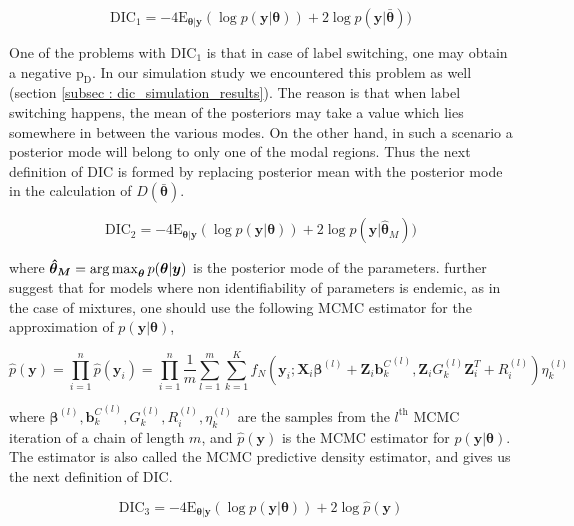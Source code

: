 \begin{equation}
\label{eq : DIC1}
\text{DIC}_1 = -4\text{E}_{\boldsymbol{\theta}|\boldsymbol{y}} (\log{p(\boldsymbol{y}|\boldsymbol{\theta})}) + 2\log{p(\boldsymbol{y}|\boldsymbol{\bar{\theta}})})
\end{equation}

One of the problems with $\text{DIC}_1$ is that in case of label switching, one may obtain a negative $\text{p}_\text{D}$. In our simulation study we encountered this problem as well (section \ref{subsec : dic_simulation_results}). The reason is that when label switching happens, the mean of the posteriors may take a value which lies somewhere in between the various modes. On the other hand, in such a scenario a posterior mode will belong to only one of the modal regions. Thus the next definition of DIC is formed by replacing posterior mean with the posterior mode in the calculation of $D(\boldsymbol{\bar{\theta}})$.

\begin{equation}
\label{eq : DIC2}
\text{DIC}_2 = -4\text{E}_{\boldsymbol{\theta}|\boldsymbol{y}} (\log{p(\boldsymbol{y}|\boldsymbol{\theta})}) + 2\log{p(\boldsymbol{y}|\boldsymbol{\hat{\theta}}_M)})
\end{equation}

where
$\boldsymbol{\hat{\theta}_M} = \operatorname*{arg\,max}_{\boldsymbol{\theta}}p(\boldsymbol{\theta}|\boldsymbol{y})$ is the posterior mode of the parameters. \citet{celeux_deviance_2006} further suggest that for models where non identifiability of parameters is endemic, as in the case of mixtures, one should use the following MCMC estimator for the approximation of $p(\boldsymbol{y}|\boldsymbol{\theta})$,

$$\hat{p}(\boldsymbol{y}) = \prod_{i=1}^n \hat{p}(\boldsymbol{y}_i) = \prod_{i=1}^n \frac 1 m \sum_{l=1}^m \sum_{k=1}^K f_N(\boldsymbol{y}_i; \boldsymbol{X}_i\boldsymbol{\beta}^{(l)} + \boldsymbol{Z}_i {\boldsymbol{b}_k^C}^{(l)}, \boldsymbol{Z}_{i} G_k^{(l)} \boldsymbol{Z}_{i}^T+ R_i^{(l)}) \eta_k^{(l)}$$

where $\boldsymbol{\beta}^{(l)}, {\boldsymbol{b}_k^C}^{(l)}, G_k^{(l)}, R_i^{(l)}, \eta_k^{(l)}$ are the samples from the $l^{\text{th}}$ MCMC iteration of a chain of length $m$, and $\hat{p}(\boldsymbol{y})$ is the MCMC estimator for $p(\boldsymbol{y}|\boldsymbol{\theta})$. The estimator is also called the MCMC predictive density estimator, and gives us the next definition of DIC.

\begin{equation}
\label{eq : DIC3}
\text{DIC}_3 =-4\text{E}_{\boldsymbol{\theta}|\boldsymbol{y}} (\log{p(\boldsymbol{y}|\boldsymbol{\theta})}) + 2\log{\hat{p}(\boldsymbol{y})}
\end{equation}

